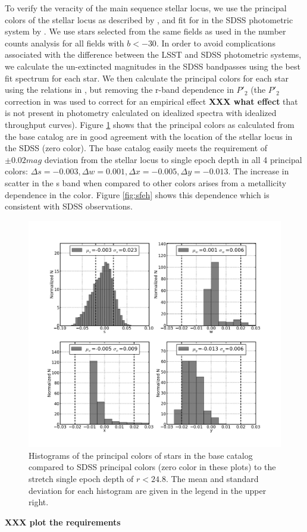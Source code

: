 \documentclass[]{article}
\begin{document}
To verify the veracity of the main sequence stellar locus, we use the
principal colors of the stellar locus as described by \citet{helmi02}, and 
fit for in the SDSS photometric system by \citet{ivezic04}.
We use stars selected from the same fields as used in the number counts analysis for all fields with $b<-30$.
In order to avoid complications associated with the difference between the LSST and SDSS photometric systems, we calculate the un-extincted 
magnitudes in the SDSS bandpasses using the best fit spectrum for each star.  We then calculate
the principal colors for each star using the relations in
\citet{ivezic04}, but removing the r-band dependence in $P\prime_{2}$
(the $P\prime_{2}$  correction
in \citet{ivezic04} was used to correct for an empirical effect {\bf
  XXX what effect} that is not present in photometry calculated on idealized spectra with idealized throughput
curves). Figure
\ref{fig:principalcolorshist} shows that the principal colors as calculated from the base catalog are in good agreement with
the location of the stellar locus in the SDSS (zero color).  The base catalog easily meets the requirement of $\pm0.02mag$ deviation
from the stellar locus to single epoch depth in all 4 principal colors: ${\Delta}s=-0.003, {\Delta}w=0.001, {\Delta}x=-0.005, {\Delta}y=-0.013$.  
The increase in scatter in the s band when compared to other colors arises from a metallicity dependence in the color.  Figure \ref{fig:sfeh} shows this 
dependence which is consistent with SDSS observations.

\begin{figure}[ht]
\centering
\includegraphics[width=5in]{validation_figures/principal_colors_hist.png}
\caption{Histograms of the principal colors of stars in the base
  catalog compared to SDSS principal colors (zero color in these
  plots) to the stretch single epoch depth of $r < 24.8$. The mean and
  standard deviation for each
histogram are given in the legend in the upper right.\label{fig:principalcolorshist}}
\end{figure}
{\bf XXX plot the requirements}
\end{document}
